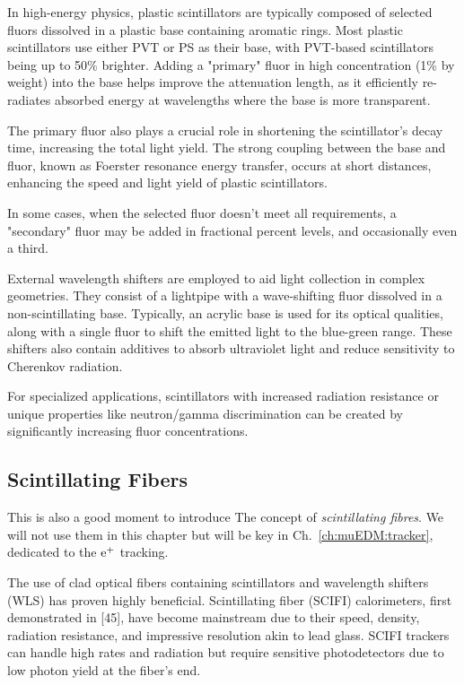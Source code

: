 \begin{refsection}
        In high-energy physics, plastic scintillators are typically composed of selected fluors dissolved in a plastic base containing aromatic rings. Most plastic scintillators use either PVT or PS as their base, with PVT-based scintillators being up to 50\% brighter. Adding a "primary" fluor in high concentration (1\% by weight) into the base helps improve the attenuation length, as it efficiently re-radiates absorbed energy at wavelengths where the base is more transparent.

        The primary fluor also plays a crucial role in shortening the scintillator's decay time, increasing the total light yield. The strong coupling between the base and fluor, known as Foerster resonance energy transfer, occurs at short distances, enhancing the speed and light yield of plastic scintillators.

        In some cases, when the selected fluor doesn't meet all requirements, a "secondary" fluor may be added in fractional percent levels, and occasionally even a third.

        External wavelength shifters are employed to aid light collection in complex geometries. They consist of a lightpipe with a wave-shifting fluor dissolved in a non-scintillating base. Typically, an acrylic base is used for its optical qualities, along with a single fluor to shift the emitted light to the blue-green range. These shifters also contain additives to absorb ultraviolet light and reduce sensitivity to Cherenkov radiation.

        For specialized applications, scintillators with increased radiation resistance or unique properties like neutron/gamma discrimination can be created by significantly increasing fluor concentrations.
        
        \subsection{Scintillating Fibers}
        This is also a good moment to introduce The concept of \textit{scintillating fibres}.
        We will not use them in this chapter but will be key in Ch.~\ref{ch:muEDM:tracker}, dedicated to the $\text{e}^+$ tracking.
        
        The use of clad optical fibers containing scintillators and wavelength shifters (WLS) has proven highly beneficial. Scintillating fiber (SCIFI) calorimeters, first demonstrated in [45], have become mainstream due to their speed, density, radiation resistance, and impressive resolution akin to lead glass. SCIFI trackers can handle high rates and radiation but require sensitive photodetectors due to low photon yield at the fiber's end. 


\end{refsection}
